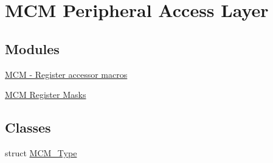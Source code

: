 \hypertarget{group__MCM__Peripheral__Access__Layer}{}\section{M\+CM Peripheral Access Layer}
\label{group__MCM__Peripheral__Access__Layer}
\subsection*{Modules}
\begin{DoxyCompactItemize}
\item 
\hyperlink{group__MCM__Register__Accessor__Macros}{M\+C\+M -\/ Register accessor macros}
\item 
\hyperlink{group__MCM__Register__Masks}{M\+C\+M Register Masks}
\end{DoxyCompactItemize}
\subsection*{Classes}
\begin{DoxyCompactItemize}
\item 
struct \hyperlink{structMCM__Type}{M\+C\+M\+\_\+\+Type}
\end{DoxyCompactItemize}
